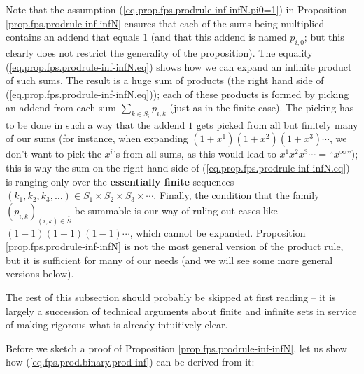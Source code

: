 Note that the assumption (\ref{eq.prop.fps.prodrule-inf-infN.pi0=1}) in
Proposition \ref{prop.fps.prodrule-inf-infN} ensures that each of the sums
being multiplied contains an addend that equals $1$ (and that this addend is
named $p_{i,0}$; but this clearly does not restrict the generality of the
proposition). The equality (\ref{eq.prop.fps.prodrule-inf-infN.eq}) shows how
we can expand an infinite product of such sums. The result is a huge sum of
products (the right hand side of (\ref{eq.prop.fps.prodrule-inf-infN.eq}));
each of these products is formed by picking an addend from each sum
$\sum_{k\in S_{i}}p_{i,k}$ (just as in the finite case). The picking has to be
done in such a way that the addend $1$ gets picked from all but finitely many
of our sums (for instance, when expanding $\left(  1+x^{1}\right)  \left(
1+x^{2}\right)  \left(  1+x^{3}\right)  \cdots$, we don't want to pick the
$x^{i}$'s from all sums, as this would lead to $x^{1}x^{2}x^{3}\cdots
=$\textquotedblleft$x^{\infty}$\textquotedblright); this is why the sum on the
right hand side of (\ref{eq.prop.fps.prodrule-inf-infN.eq}) is ranging only
over the \textbf{essentially finite} sequences $\left(  k_{1},k_{2}%
,k_{3},\ldots\right)  \in S_{1}\times S_{2}\times S_{3}\times\cdots$. Finally,
the condition that the family $\left(  p_{i,k}\right)  _{\left(  i,k\right)
\in\overline{S}}$ be summable is our way of ruling out cases like $\left(
1-1\right)  \left(  1-1\right)  \left(  1-1\right)  \cdots$, which cannot be
expanded. Proposition \ref{prop.fps.prodrule-inf-infN} is not the most general
version of the product rule, but it is sufficient for many of our needs (and
we will see some more general versions below).

The rest of this subsection should probably be skipped at first reading -- it
is largely a succession of technical arguments about finite and infinite sets
in service of making rigorous what is already intuitively clear.

Before we sketch a proof of Proposition \ref{prop.fps.prodrule-inf-infN}, let
us show how (\ref{eq.fps.prod.binary.prod-inf}) can be derived from it:

